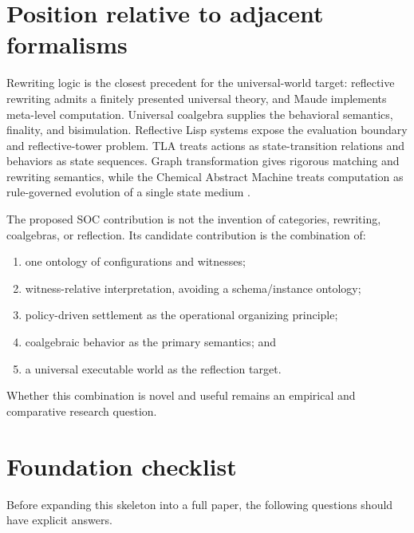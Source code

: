 \documentclass[11pt]{article}
\theoremstyle{remark}
\begin{document}
\section{Position relative to adjacent formalisms}

Rewriting logic is the closest precedent for the universal-world target:
reflective rewriting admits a finitely presented universal theory, and Maude
implements meta-level computation. Universal coalgebra supplies the behavioral
semantics, finality, and bisimulation. Reflective Lisp systems expose the
evaluation boundary and reflective-tower problem. TLA treats actions as
state-transition relations and behaviors as state sequences. Graph
transformation gives rigorous matching and rewriting semantics, while the
Chemical Abstract Machine treats computation as rule-governed evolution of a
single state medium
\cite{clavel1996reflection,rutten2000universal,smith1984reflection,
lamport1994tla,konig2018graph,berry1992cham}.

The proposed SOC contribution is not the invention of categories, rewriting,
coalgebras, or reflection. Its candidate contribution is the combination of:

\begin{enumerate}[label=(\roman*)]
  \item one ontology of configurations and witnesses;
  \item witness-relative interpretation, avoiding a schema/instance ontology;
  \item policy-driven settlement as the operational organizing principle;
  \item coalgebraic behavior as the primary semantics; and
  \item a universal executable world as the reflection target.
\end{enumerate}

Whether this combination is novel and useful remains an empirical and
comparative research question.

\section{Foundation checklist}

Before expanding this skeleton into a full paper, the following questions
should have explicit answers.
\end{document}
